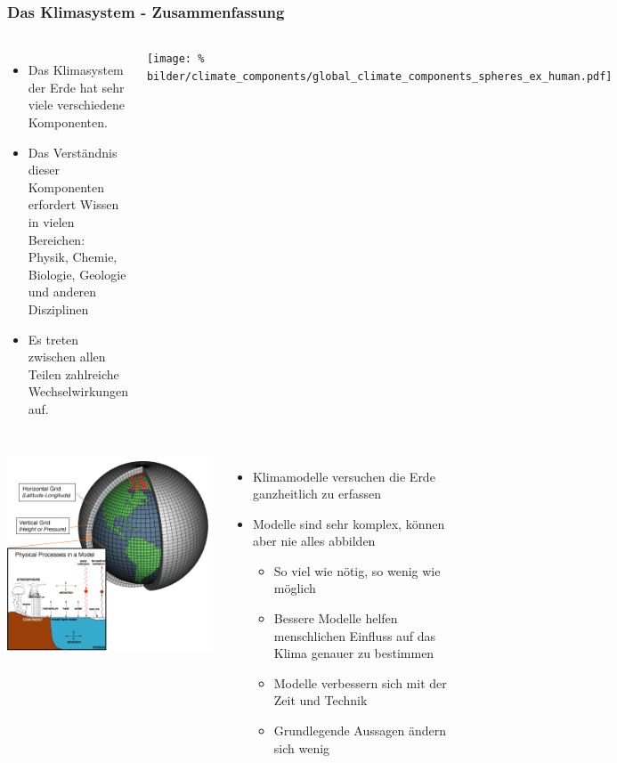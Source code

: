 \begin{frame}
	\frametitle{Das Klimasystem - Zusammenfassung}

	\begin{columns}
			\begin{itemize}
				\item Das Klimasystem der Erde hat sehr viele verschiedene Komponenten.
				\item Das Verständnis dieser Komponenten erfordert Wissen in vielen Bereichen: Physik, Chemie, Biologie, Geologie und anderen Disziplinen
				\item Es treten zwischen allen Teilen zahlreiche Wechselwirkungen auf.
			\end{itemize}
				\texttt{[image: \%
		        bilder/climate\_components/global\_climate\_components\_spheres\_ex\_human.pdf]}
		\end{columns}
		\begin{columns}
			\column{0.3\linewidth}
				\includegraphics[width=0.9\linewidth]{bilder/AtmosphericModelSchematic.png}
			\column{0.7\linewidth}
			\begin{itemize}
				\item Klimamodelle versuchen die Erde ganzheitlich zu erfassen
				\item Modelle sind sehr komplex, können aber nie alles abbilden
				\begin{itemize}
					\item So viel wie nötig, so wenig wie möglich
					\item Bessere Modelle helfen menschlichen Einfluss auf das Klima genauer zu bestimmen
					\item Modelle verbessern sich mit der Zeit und Technik
					\item Grundlegende Aussagen ändern sich wenig
				\end{itemize}
			\end{itemize}
		\end{columns}


\end{frame}

